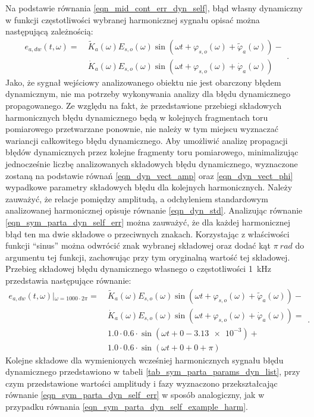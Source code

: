 Na podstawie równania \eqref{eqn_mid_cont_err_dyn_self}, błąd własny dynamiczny w funkcji częstotliwości wybranej harmonicznej sygnału opisać można następującą zależnością:
\begin{equation}
\begin{split}
e_{a,dw}(t,\omega) = ~
& \tilde{K}_{a}(\omega) E_{s,o}(\omega) \sin \left( \omega t + \varphi_{s,o}(\omega) + \tilde{\varphi}_{a}(\omega) \right) - \\
& \dot{K}_{a}(\omega) E_{s,o}(\omega) \sin \left( \omega t + \varphi_{s,o}(\omega) + \dot{\varphi}_{a}(\omega) \right)
\end{split}
\label{eqn_sym_parta_dyn_self_err}.
\end{equation}
Jako, że sygnał wejściowy analizowanego obiektu nie jest obarczony błędem dynamicznym, nie ma potrzeby wykonywania analizy dla błędu dynamicznego propagowanego. Ze względu na fakt, że przedstawione przebiegi składowych harmonicznych błędu dynamicznego będą w kolejnych fragmentach toru pomiarowego przetwarzane ponownie, nie należy w tym miejscu wyznaczać wariancji całkowitego błędu dynamicznego. Aby umożliwić analizę propagacji błędów dynamicznych przez kolejne fragmenty toru pomiarowego, minimalizując jednocześnie liczbę analizowanych składowych błędu dynamicznego, wyznaczone zostaną na podstawie równań \eqref{eqn_dyn_vect_amp} oraz \eqref{eqn_dyn_vect_phi} wypadkowe parametry składowych błędu dla kolejnych harmonicznych. Należy zauważyć, że relacje pomiędzy amplitudą, a odchyleniem standardowym analizowanej harmonicznej opisuje równanie \eqref{eqn_dyn_std}. Analizując równanie \eqref{eqn_sym_parta_dyn_self_err} można zauważyć, że dla każdej harmonicznej błąd ten ma dwie składowe o przeciwnych znakach. Korzystając z właściwości funkcji \enquote{sinus} można odwrócić znak wybranej składowej oraz dodać kąt $\pi~\unit{rad}$ do argumentu tej funkcji, zachowując przy tym oryginalną wartość tej składowej. Przebieg składowej błędu dynamicznego własnego o częstotliwości \qty{1}{kHz} przedstawia następujące równanie:
\begin{equation}
\begin{split}
e_{a,dw}(t,\omega) \left|_{\omega = 1000 \cdot 2 \pi } \right. = ~
& \tilde{K}_{a}(\omega) E_{s,o}(\omega) \sin \left( \omega t + \varphi_{s,o}(\omega) + \tilde{\varphi}_{a}(\omega) \right) - \\
& \dot{K}_{a}(\omega) E_{s,o}(\omega) \sin \left( \omega t + \varphi_{s,o}(\omega) + \dot{\varphi}_{a}(\omega) \right) = \\
& 1.0 \cdot 0.6 \cdot \sin \left( \omega t + 0 - \num{3.13e-3} \right) + \\
& 1.0 \cdot 0.6 \cdot \sin \left( \omega t + 0 + 0 + \pi \right)
\end{split}
\label{eqn_sym_parta_dyn_self_example_harm}.
\end{equation}
Kolejne składowe dla wymienionych wcześniej harmonicznych sygnału błędu dynamicznego przedstawiono w tabeli \ref{tab_sym_parta_params_dyn_list}, przy czym przedstawione wartości amplitudy i fazy wyznaczono przekształcając równanie \eqref{eqn_sym_parta_dyn_self_err} w sposób analogiczny, jak w przypadku równania \eqref{eqn_sym_parta_dyn_self_example_harm}.

